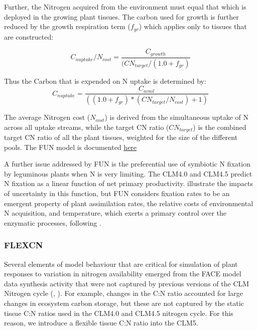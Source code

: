 \documentclass[draft,linenumbers]{agujournal}
\begin{document}
Further, the Nitrogen acquired from the environment must equal that which is deployed in the growing plant tissues. The carbon used for growth is further reduced by the growth respiration term ($f_{gr}$) which applies only to tissues that are constructed:

\begin{equation}
C_{nuptake}/N_{cost} =\frac{C_{growth}}{(CN_{target}/(1.0+f_{gr})}
\end{equation}

Thus the Carbon that is expended on N uptake is determined by:
\begin{equation}
C_{nuptake} =\frac{C_{avail}}{ ( (1.0+f_{gr})*(CN_{target} / N_{cost}) + 1) }
\end{equation}

The average Nitrogen cost ($N_{cost}$) is derived from the simultaneous uptake of N across all uptake streams, while the target CN ratio ($CN_{target}$) is the combined target CN ratio of all the plant tissues, weighted for the size of the different pools. The FUN model is documented \href{https://escomp.github.io/ctsm-docs/doc/build/html/tech_note/FUN/CLM50_Tech_Note_FUN.html}{here}

A further issue addressed by FUN is the preferential use of symbiotic N fixation by leguminous plants when N is very limiting. The CLM4.0 and CLM4.5 predict N fixation as a linear function of net primary productivity. \cite{wieder2015} illustrate the impacts of uncertainty in this function, but FUN considers fixation rates to be an emergent property of plant assimilation rates, the relative costs of environmental N acquisition, and temperature, which exerts a primary control over the enzymatic processes, following \cite{houlton2008}. 

\subsubsection{FLEXCN}
Several elements of model behaviour that are critical for simulation of plant responses to variation in nitrogen availability  emerged from the FACE model data synthesis activity that were not captured by previous versions of the CLM Nitrogen cycle (\cite{zaehle2014}, \cite{medlyn2015using}). For example, changes in the C:N ratio accounted for large changes in ecosystem carbon storage,  but these are not captured by the static tissue C:N ratios used in the CLM4.0 and CLM4.5 nitrogen cycle. For this reason, we introduce a flexible tissue C:N ratio into the CLM5. 
\end{document}
